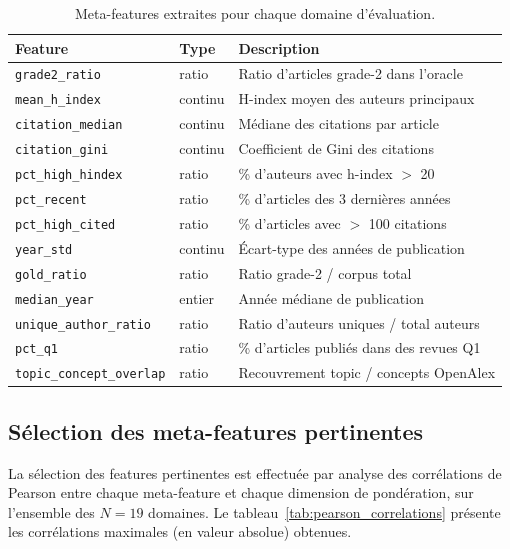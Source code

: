 \begin{table}[htbp]
  \centering
  \caption{Meta-features extraites pour chaque domaine d'évaluation.}
  \label{tab:meta_features_list}
  \begin{tabular}{llp{}}
    \toprule
    \textbf{Feature} & \textbf{Type} & \textbf{Description} \\
    \midrule
    \texttt{grade2\_ratio} & ratio & Ratio d'articles grade-2 dans l'oracle \\
    \texttt{mean\_h\_index} & continu & H-index moyen des auteurs principaux \\
    \texttt{citation\_median} & continu & Médiane des citations par article \\
    \texttt{citation\_gini} & continu & Coefficient de Gini des citations \\
    \texttt{pct\_high\_hindex} & ratio & \% d'auteurs avec h-index $>$ 20 \\
    \texttt{pct\_recent} & ratio & \% d'articles des 3 dernières années \\
    \texttt{pct\_high\_cited} & ratio & \% d'articles avec $>$ 100 citations \\
    \texttt{year\_std} & continu & Écart-type des années de publication \\
    \texttt{gold\_ratio} & ratio & Ratio grade-2 / corpus total \\
    \texttt{median\_year} & entier & Année médiane de publication \\
    \texttt{unique\_author\_ratio} & ratio & Ratio d'auteurs uniques / total auteurs \\
    \texttt{pct\_q1} & ratio & \% d'articles publiés dans des revues Q1 \\
    \texttt{topic\_concept\_overlap} & ratio & Recouvrement topic / concepts OpenAlex \\
    \bottomrule
  \end{tabular}
\end{table}

\subsection{Sélection des meta-features pertinentes}
\label{sec:feature_selection}

La sélection des features pertinentes est effectuée par analyse des
corrélations de Pearson entre chaque meta-feature et chaque dimension
de pondération, sur l'ensemble des $N = 19$ domaines. Le tableau~\ref{tab:pearson_correlations}
présente les corrélations maximales (en valeur absolue) obtenues.

